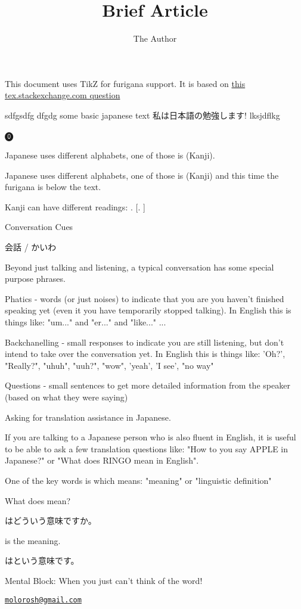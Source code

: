 \documentclass[44pt, oneside]{article}   	%
\title{Brief Article}
\author{The Author}
\date{}
\begin{document}

This document uses TikZ for furigana support.  It is based on 
\href{https://tex.stackexchange.com/questions/95729/typesetting-furigana-above-and-below-original-text}{this tex.stackexchange.com question}


sdfgsdfg dfgdg some basic japanese text
私は日本語の勉強します! 
lksjdflkg

⓿

Japanese uses different alphabets, one of those is  (Kanji).

Japanese uses different alphabets, one of those is  (Kanji) and this time the furigana is below the text.

Kanji can have different readings: .   [.  \?  ]

Conversation Cues

会話 / かいわ   

Beyond just talking and listening, a typical conversation has some special purpose phrases.

Phatics - words (or just noises) to indicate that you are you haven't finished speaking yet (even it you have temporarily stopped talking).  In English this is things like: "um..." and "er..." and "like..." ... 

Backchanelling - small responses to indicate you are still listening, but don't intend to take over the conversation yet.  In English this is things like: 'Oh?', "Really?", "uhuh", "uuh?", "wow", 'yeah', 'I see', "no way"

Questions - small sentences to get more detailed information from the speaker (based on what they were saying)

Asking for translation assistance in Japanese.

If you are talking to a Japanese person who is also fluent in English, it is useful to be able to ask a few translation questions like: "How to you say APPLE in Japanese?" or "What does RINGO mean in English".

One of the key words is  which means: "meaning" or "linguistic definition"

What does \?{} mean?

\?{}はどういう意味ですか。

\?{} is the meaning.

\?{}はという意味です。



Mental Block: When you just can't think of the word!

\href{mailto:molorosh@gmail.com}{\nolinkurl{molorosh@gmail.com} }
\end{document}
